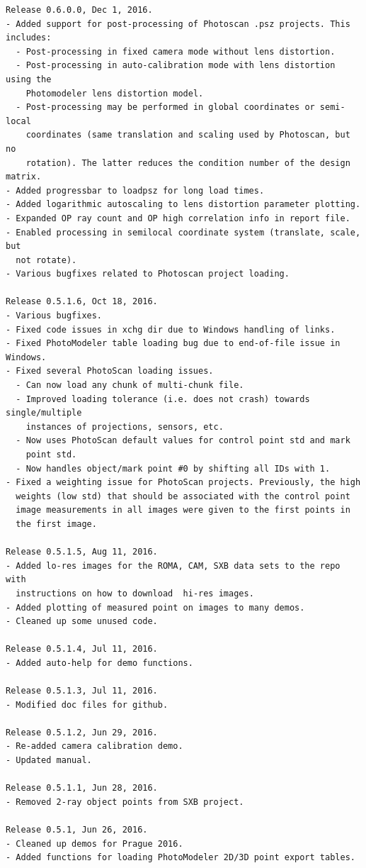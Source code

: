 \documentclass{article}
\begin{document}
\begin{verbatim}
Release 0.6.0.0, Dec 1, 2016.
- Added support for post-processing of Photoscan .psz projects. This includes:
  - Post-processing in fixed camera mode without lens distortion.
  - Post-processing in auto-calibration mode with lens distortion using the
    Photomodeler lens distortion model.
  - Post-processing may be performed in global coordinates or semi-local
    coordinates (same translation and scaling used by Photoscan, but no
    rotation). The latter reduces the condition number of the design matrix.
- Added progressbar to loadpsz for long load times.
- Added logarithmic autoscaling to lens distortion parameter plotting.
- Expanded OP ray count and OP high correlation info in report file.
- Enabled processing in semilocal coordinate system (translate, scale, but
  not rotate).
- Various bugfixes related to Photoscan project loading.

Release 0.5.1.6, Oct 18, 2016.
- Various bugfixes.
- Fixed code issues in xchg dir due to Windows handling of links.
- Fixed PhotoModeler table loading bug due to end-of-file issue in Windows.
- Fixed several PhotoScan loading issues.
  - Can now load any chunk of multi-chunk file.
  - Improved loading tolerance (i.e. does not crash) towards single/multiple 
    instances of projections, sensors, etc.
  - Now uses PhotoScan default values for control point std and mark
    point std.
  - Now handles object/mark point #0 by shifting all IDs with 1.
- Fixed a weighting issue for PhotoScan projects. Previously, the high
  weights (low std) that should be associated with the control point
  image measurements in all images were given to the first points in
  the first image.

Release 0.5.1.5, Aug 11, 2016.
- Added lo-res images for the ROMA, CAM, SXB data sets to the repo with 
  instructions on how to download  hi-res images.
- Added plotting of measured point on images to many demos.
- Cleaned up some unused code.

Release 0.5.1.4, Jul 11, 2016.
- Added auto-help for demo functions.

Release 0.5.1.3, Jul 11, 2016.
- Modified doc files for github.

Release 0.5.1.2, Jun 29, 2016.
- Re-added camera calibration demo.
- Updated manual.

Release 0.5.1.1, Jun 28, 2016.
- Removed 2-ray object points from SXB project.

Release 0.5.1, Jun 26, 2016.
- Cleaned up demos for Prague 2016.
- Added functions for loading PhotoModeler 2D/3D point export tables.


\end{verbatim}
\end{document}
